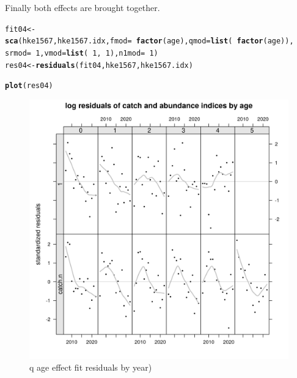 \documentclass[a4paper,english,11pt]{article}\usepackage[]{graphicx}\usepackage[]{xcolor}
\makeatletter
\newcommand{\hlnum}[1]{\textcolor[rgb]{0.686,0.059,0.569}{#1}}%
\newcommand{\hlopt}[1]{\textcolor[rgb]{0,0,0}{#1}}%
\newcommand{\hldef}[1]{\textcolor[rgb]{0.345,0.345,0.345}{#1}}%
\newcommand{\hlkwb}[1]{\textcolor[rgb]{0.69,0.353,0.396}{#1}}%
\newcommand{\hlkwc}[1]{\textcolor[rgb]{0.333,0.667,0.333}{#1}}%
\newcommand{\hlkwd}[1]{\textcolor[rgb]{0.737,0.353,0.396}{\textbf{#1}}}%
\newenvironment{kframe}{%
 \def\at@end@of@kframe{}%
 \ifinner\ifhmode%
  \def\at@end@of@kframe{\end{minipage}}%
  \begin{minipage}{\columnwidth}%
 \fi\fi%
 \def\FrameCommand##1{\hskip\@totalleftmargin \hskip-\fboxsep
 \colorbox{shadecolor}{##1}\hskip-\fboxsep
     \hskip-\linewidth \hskip-\@totalleftmargin \hskip\columnwidth}%
 \MakeFramed {\advance\hsize-\width
   \@totalleftmargin\z@ \linewidth\hsize
   \@setminipage}}%
 {\par\unskip\endMakeFramed%
 \at@end@of@kframe}
\newenvironment{knitrout}{}{} %
\makeatother
\begin{document}
Finally both effects are brought together.

\begin{knitrout}
\color{fgcolor}\begin{kframe}
\begin{alltt}
\hldef{fit04} \hlkwb{<-} \hlkwd{sca}\hldef{(hke1567, hke1567.idx,} \hlkwc{fmod} \hldef{=} \hlopt{~}\hlkwd{factor}\hldef{(age),} \hlkwc{qmod} \hldef{=} \hlkwd{list}\hldef{(}\hlopt{~}\hlkwd{factor}\hldef{(age)),}
    \hlkwc{srmod} \hldef{=} \hlopt{~}\hlnum{1}\hldef{,} \hlkwc{vmod} \hldef{=} \hlkwd{list}\hldef{(}\hlopt{~}\hlnum{1}\hldef{,} \hlopt{~}\hlnum{1}\hldef{),} \hlkwc{n1mod} \hldef{=} \hlopt{~}\hlnum{1}\hldef{)}
\hldef{res04} \hlkwb{<-} \hlkwd{residuals}\hldef{(fit04, hke1567, hke1567.idx)}
\end{alltt}
\end{kframe}
\end{knitrout}

\begin{knitrout}
\color{fgcolor}\begin{kframe}
\begin{alltt}
\hlkwd{plot}\hldef{(res04)}
\end{alltt}
\end{kframe}\begin{figure}[H]

{\centering \includegraphics[width=.9\linewidth]{figure/fqageresbyyear-1} 

}

\caption[q age effect fit residuals by year)]{q age effect fit residuals by year)}\label{fig:fqageresbyyear}
\end{figure}

\end{knitrout}
\end{document}
